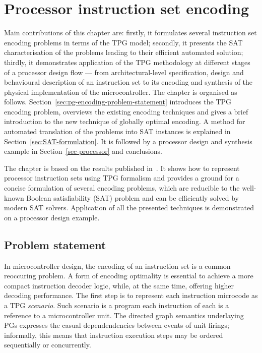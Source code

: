 \chapter{Processor instruction set encoding}

Main contributions of this chapter are: firstly, it formulates several
instruction set encoding problems in terms of the TPG model; secondly,
it presents the SAT characterisation of the problems leading to their
efficient automated solution; thirdly, it demonstrates application
of the TPG methodology at different stages of a processor design
flow --- from architectural-level specification, design and behavioural
description of an instruction set to its encoding and synthesis of
the physical implementation of the microcontroller. The chapter is organised
as follows. Section~\ref{sec:pg-encoding-problem-statement} introduces
the TPG encoding problem, overviews the existing encoding techniques and gives
a brief introduction to the new technique of globally optimal encoding.
A method for automated translation of the problems into SAT instances
is explained in Section~\ref{sec:SAT-formulation}. It is followed
by a processor design and synthesis example in Section~\ref{sec-processor} and
conclusions.

\label{chap:PGEncoding}

The chapter is based on the results published in~\cite{cpog_encoding}. It shows how to represent processor instruction sets using TPG formalism and provides
a ground for a concise formulation of several encoding problems, which
are reducible to the well-known Boolean satisfiability (SAT) problem
and can be efficiently solved by modern SAT solvers. Application of
all the presented techniques is demonstrated on a processor design
example.

\section{Problem statement\label{sec:pg-encoding-problem-statement}}
In microcontroller design, the encoding of an instruction set is a common reoccuring problem. A form of encoding optimality is essential to achieve a more compact instruction decoder logic, while, at the same time, offering higher decoding performance. The first step is to represent each instruction microcode as a TPG \emph{scenario}. Such scenario is a program each instruction of each is a reference to a microcontroller unit. The directed graph semantics underlaying PGs expresses the casual dependendencies between events of unit firings; informally, this means that instruction execution steps may be ordered sequentially or concurrently.   


